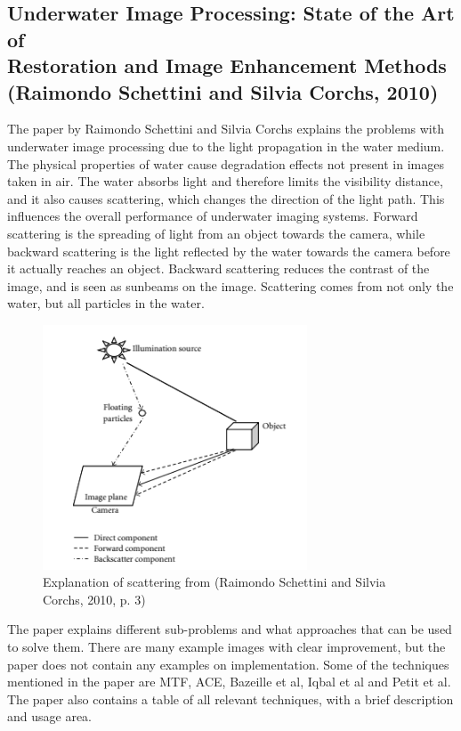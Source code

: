 \subsection{Underwater Image Processing: State of the Art of \\
Restoration and Image Enhancement Methods \\
(Raimondo Schettini and Silvia Corchs, 2010)}
The paper by Raimondo Schettini and Silvia Corchs explains the problems with underwater image processing due to the light propagation in the water medium. The physical properties of water cause degradation effects not present in images taken in air. The water absorbs light and therefore limits the visibility distance, and it also causes scattering, which changes the direction of the light path. This influences the overall performance of underwater imaging systems. Forward scattering is the spreading of light from an object towards the camera, while backward scattering is the light reflected by the water towards the camera before it actually reaches an object. Backward scattering reduces the contrast of the image, and is seen as sunbeams on the image. Scattering comes from not only the water, but all particles in the water. 

\begin{figure}[h]
    \centering
    \includegraphics[width=0.7\textwidth]{Images/image_from_paper}
    \caption{Explanation of scattering from (Raimondo Schettini and Silvia Corchs, 2010, p. 3)}
    \label{fig:image_from_paper}
\end{figure}

The paper explains different sub-problems and what approaches that can be used to solve them. There are many example images with clear improvement, but the paper does not contain any examples on implementation. Some of the techniques mentioned in the paper are MTF, ACE, Bazeille et al, Iqbal et al and Petit et al. The paper also contains a table of all relevant techniques, with a brief description and usage area.


